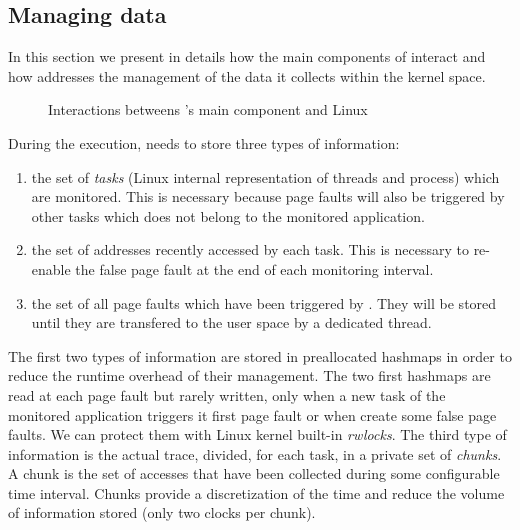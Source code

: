 \subsection{Managing data}
\label{sec:design-tech}

In this section we present in details how the main components of \Moca
interact and how \Moca addresses the management of the data it collects
within the kernel space.

\begin{figure}[htb]
    \centering
    \caption{Interactions betweens \Moca's main component and Linux}
    \label{fig:moca}
\end{figure}


During the execution, \Moca needs to store three types of information:
\begin{enumerate}
    \item the set of \emph{tasks} (Linux internal representation of threads and process) which are
monitored. This is necessary because page faults will also be triggered by other tasks which does not belong to
the monitored application.
    \item the set of addresses recently accessed by each task. This is necessary to re-enable the false page
      fault at the end of each monitoring interval.
    \item the set of all page faults which have been triggered by \Moca. They will be stored until they are
      transfered to the user space by a dedicated thread.
\end{enumerate}

The first two types of information are stored in preallocated hashmaps in order to reduce the
runtime overhead of their management.  The two first hashmaps are read at each page fault but rarely
written, only when a new task of the monitored application triggers it first page
fault or when \Moca create some false page faults. We can protect
them with Linux kernel built-in \emph{rwlocks}.
The third type of information is the actual
trace, divided, for each task, in a private set of \emph{chunks}. A chunk is the set of
accesses that have been collected during some configurable time interval. Chunks provide a discretization
of the time and reduce the volume of information stored (only
two clocks per chunk).

